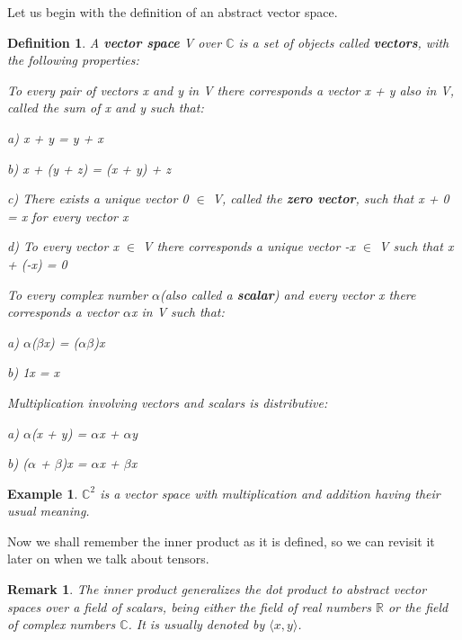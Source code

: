 \documentclass[12pt,a4paper]{article}
\newtheorem{remark}[thm]{Remark}
\newtheorem{defn}[thm]{Definition}
\newtheorem{exmp}{Example}[section]
\begin{document}
Let us begin with the definition of an abstract vector space.
\begin{defn} A \textbf{vector space} V over $\mathbb{C}$ is a set of objects called \textbf{vectors}, with the following properties:
\item[1.] To every pair of vectors x and y in V there corresponds a vector x + y also in V, called the \textit{sum} of x and y such that:
\item \hspace{1cm} a) x + y = y + x
\item \hspace{1cm} b) x + (y + z) = (x + y) + z
\item \hspace{1cm} c) There exists a unique vector 0 $\in$ V, called the \textbf{zero vector}, such that x + 0 = x for every vector x
\item \hspace{1cm} d) To every vector x $\in$ V there corresponds a unique vector -x $\in$ V such that x + (-x) = 0
\item[2.] To every complex number $\alpha$(also called a \textbf{scalar}) and every vector x there corresponds a vector $\alpha$x in V such that:
\item \hspace{1cm} a) $\alpha$($\beta$x) = ($\alpha$$\beta$)x
\item \hspace{1cm} b) 1x = x
\item[3.] Multiplication involving vectors and scalars is distributive:
\item \hspace{1cm} a) $\alpha$(x + y) = $\alpha$x + $\alpha$y
\item \hspace{1cm} b) ($\alpha$ + $\beta$)x = $\alpha$x + $\beta$x
\end{defn}
\begin{exmp}$\mathbb{C}^2$ is a vector space with multiplication and addition having their usual meaning.
\end{exmp}
Now we shall remember the inner product as it is defined, so we can revisit it later on when we talk about tensors.
\begin{remark}
The inner product generalizes the dot product to abstract vector spaces over a field of scalars, being either the field of real numbers $\mathbb{R}$ or the field of complex numbers $\mathbb{C}$. It is usually denoted by $\langle x, y\rangle$.
\end{remark}
\end{document}
